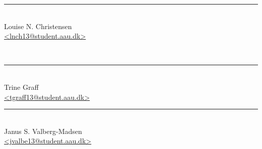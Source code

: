 \begin{center}
\begin{minipage}[b]{0.45\textwidth}
 \centering
 \rule{\textwidth}{0.5pt}\\
  Louise N. Christensen\\
 {\footnotesize\ttfamily \href{mailto:lnch13@student.aau.dk}{<lnch13@student.aau.dk>}}
\end{minipage}\\[10mm]
\begin{minipage}[b]{0.45\textwidth}
 \centering
 \rule{\textwidth}{0.5pt}\\
  Trine Graff\\
 {\footnotesize\ttfamily \href{mailto:tgraff13@student.aau.dk}{<tgraff13@student.aau.dk>}}
\end{minipage}
\hfill
\begin{minipage}[b]{0.45\textwidth}
 \centering
 \rule{\textwidth}{0.5pt}\\
  Janus S. Valberg-Madsen\\
 {\footnotesize\ttfamily \href{mailto:jvalbe13@student.aau.dk}{<jvalbe13@student.aau.dk>}}
\end{minipage}
\end{center}

